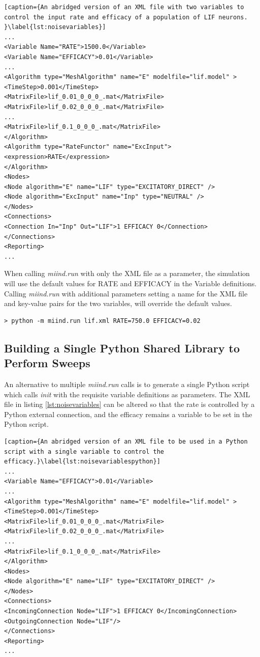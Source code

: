 \documentclass[utf8]{frontiers_suppmat} %
\begin{document}
\begin{lstlisting}[caption={An abridged version of an XML file with two variables to control the input rate and efficacy of a population of LIF neurons.  }\label{lst:noisevariables}]
...
<Variable Name="RATE">1500.0</Variable>
<Variable Name="EFFICACY">0.01</Variable>
...
<Algorithm type="MeshAlgorithm" name="E" modelfile="lif.model" >
<TimeStep>0.001</TimeStep>
<MatrixFile>lif_0.01_0_0_0_.mat</MatrixFile>
<MatrixFile>lif_0.02_0_0_0_.mat</MatrixFile>
...
<MatrixFile>lif_0.1_0_0_0_.mat</MatrixFile>
</Algorithm>
<Algorithm type="RateFunctor" name="ExcInput">
<expression>RATE</expression>
</Algorithm>
<Nodes>
<Node algorithm="E" name="LIF" type="EXCITATORY_DIRECT" />
<Node algorithm="ExcInput" name="Inp" type="NEUTRAL" />
</Nodes>
<Connections>
<Connection In="Inp" Out="LIF">1 EFFICACY 0</Connection>
</Connections>
<Reporting>
...
\end{lstlisting}

When calling \textit{miind.run} with only the XML file as a parameter, the simulation will use the default values for RATE and EFFICACY in the Variable definitions. Calling \textit{miind.run} with additional parameters setting a name for the XML file and key-value pairs for the two variables, will override the default values.

\begin{lstlisting}
> python -m miind.run lif.xml RATE=750.0 EFFICACY=0.02
\end{lstlisting}

\subsection{Building a Single Python Shared Library to Perform Sweeps}
An alternative to multiple \textit{miind.run} calls is to generate a single Python script which calls \textit{init} with the requisite variable definitions as parameters. The XML file in listing \ref{lst:noisevariables} can be altered so that the rate is controlled by a Python external connection, and the efficacy remains a variable to be set in the Python script.

\begin{lstlisting}[caption={An abridged version of an XML file to be used in a Python script with a single variable to control the efficacy.}\label{lst:noisevariablespython}]
...
<Variable Name="EFFICACY">0.01</Variable>
...
<Algorithm type="MeshAlgorithm" name="E" modelfile="lif.model" >
<TimeStep>0.001</TimeStep>
<MatrixFile>lif_0.01_0_0_0_.mat</MatrixFile>
<MatrixFile>lif_0.02_0_0_0_.mat</MatrixFile>
...
<MatrixFile>lif_0.1_0_0_0_.mat</MatrixFile>
</Algorithm>
<Nodes>
<Node algorithm="E" name="LIF" type="EXCITATORY_DIRECT" />
</Nodes>
<Connections>
<IncomingConnection Node="LIF">1 EFFICACY 0</IncomingConnection>
<OutgoingConnection Node="LIF"/>
</Connections>
<Reporting>
...
\end{lstlisting}
\end{document}
